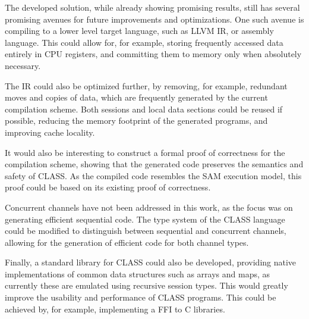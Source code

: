 \documentclass[sigconf,nonacm,natbib=true]{acmart}
\begin{document}
The developed solution, while already showing promising results, still has several promising avenues for future improvements and optimizations. One such avenue is compiling to a lower level target language, such as LLVM IR, or assembly language. This could allow for, for example, storing frequently accessed data entirely in CPU registers, and committing them to memory only when absolutely necessary.

The \ac{IR} could also be optimized further, by removing, for example, redundant moves and copies of data, which are frequently generated by the current compilation scheme. Both sessions and local data sections could be reused if possible, reducing the memory footprint of the generated programs, and improving cache locality.

It would also be interesting to construct a formal proof of correctness for the compilation scheme, showing that the generated code preserves the semantics and safety of \ac{CLASS}. As the compiled code resembles the \ac{SAM} execution model, this proof could be based on its existing proof of correctness.

Concurrent channels have not been addressed in this work, as the focus was on generating efficient sequential code. The type system of the \ac{CLASS} language could be modified to distinguish between sequential and concurrent channels, allowing for the generation of efficient code for both channel types.

Finally, a standard library for \ac{CLASS} could also be developed, providing native implementations of common data structures such as arrays and maps, as currently these are emulated using recursive session types. This would greatly improve the usability and performance of \ac{CLASS} programs. This could be achieved by, for example, implementing a \ac{FFI} to C libraries.




\end{document}
